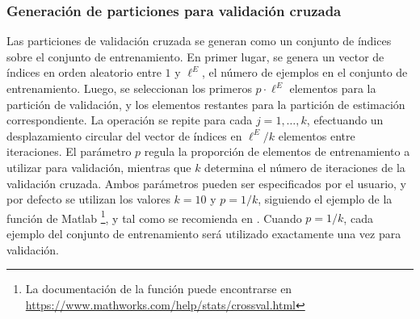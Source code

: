 %
%
\subsubsection{Generación de particiones para validación cruzada}
%
Las particiones de validación cruzada se generan como un conjunto de
índices sobre el conjunto de entrenamiento.
En primer lugar, se genera un vector de índices en orden aleatorio
entre $1$ y $\ell^E$, el número de ejemplos en el conjunto de
entrenamiento.
Luego, se seleccionan los primeros $p\cdot\ell^E$ elementos para la
partición de validación, y los elementos restantes para la partición
de estimación correspondiente.
La operación se repite para cada $j=1,\ldots,k$, efectuando un
desplazamiento circular del vector de índices en $\ell^E/k$ elementos
entre iteraciones.
El parámetro $p$ regula la proporción de elementos de entrenamiento a
utilizar para validación, mientras que $k$ determina el número de
iteraciones de la validación cruzada.
Ambos parámetros pueden ser especificados por el usuario, y por
defecto se utilizan los valores $k=10$ y $p=1/k$, siguiendo el ejemplo
de la función de Matlab \footnote{%
  La documentación de la función  puede encontrarse en
  \url{https://www.mathworks.com/help/stats/crossval.html}
}, y tal como se recomienda en \cite{hastie}.
Cuando $p=1/k$, cada ejemplo del conjunto de entrenamiento será
utilizado exactamente una vez para validación.
